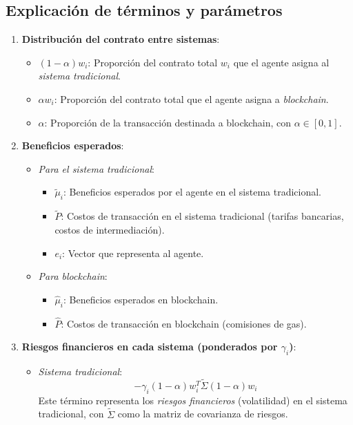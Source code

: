 \subsection{Explicación de términos y parámetros}

\begin{enumerate}
    \item \textbf{Distribución del contrato entre sistemas}:
    \begin{itemize}
        \item $(1 - \alpha) w_i$: Proporción del contrato total $w_i$ que el agente asigna al \textit{sistema tradicional}.
        \item $\alpha w_i$: Proporción del contrato total que el agente asigna a \textit{blockchain}.
        \item $\alpha$: Proporción de la transacción destinada a blockchain, con $\alpha \in [0, 1]$.
    \end{itemize}
    
    \item \textbf{Beneficios esperados}:
    \begin{itemize}
        \item \textit{Para el sistema tradicional}:
        \begin{itemize}
            \item $\tilde{\mu}_i$: Beneficios esperados por el agente en el sistema tradicional.
            \item $\tilde{P}$: Costos de transacción en el sistema tradicional (tarifas bancarias, costos de intermediación).
            \item $e_i$: Vector que representa al agente.
        \end{itemize}
        \item \textit{Para blockchain}:
        \begin{itemize}
            \item $\hat{\mu}_i$: Beneficios esperados en blockchain.
            \item $\hat{P}$: Costos de transacción en blockchain (comisiones de gas).
        \end{itemize}
    \end{itemize}

    \item \textbf{Riesgos financieros en cada sistema (ponderados por $\gamma_i$)}:
    \begin{itemize}
        \item \textit{Sistema tradicional}:
        \[
        - \gamma_i (1 - \alpha) w_i^T \tilde{\Sigma} (1 - \alpha) w_i
        \]
        Este término representa los \textit{riesgos financieros} (volatilidad) en el sistema tradicional, con $\tilde{\Sigma}$ como la matriz de covarianza de riesgos.
        

\end{itemize}
\end{enumerate}
